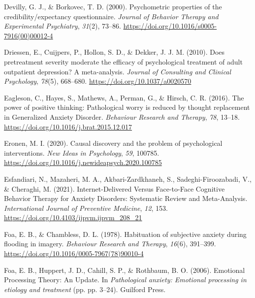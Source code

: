 \documentclass[
  man,floatsintext]{apa7}
\newlength{\cslhangindent}
\newlength{\cslentryspacingunit} %
\newenvironment{CSLReferences}[2] %
 {%
  \setlength{\parindent}{0pt}
  \ifodd #1
  \let\oldpar\par
  \def\par{\hangindent=\cslhangindent\oldpar}
  \fi
  \setlength{\parskip}{#2\cslentryspacingunit}
 }%
 {}
\begin{document}
\begin{CSLReferences}{1}{0}
\leavevmode{}%
Devilly, G. J., \& Borkovec, T. D. (2000). Psychometric properties of the credibility/expectancy questionnaire. \emph{Journal of Behavior Therapy and Experimental Psychiatry}, \emph{31}(2), 73--86. \url{https://doi.org/10.1016/s0005-7916(00)00012-4}

\leavevmode{}%
Driessen, E., Cuijpers, P., Hollon, S. D., \& Dekker, J. J. M. (2010). Does pretreatment severity moderate the efficacy of psychological treatment of adult outpatient depression? A meta-analysis. \emph{Journal of Consulting and Clinical Psychology}, \emph{78}(5), 668--680. \url{https://doi.org/10.1037/a0020570}

\leavevmode{}%
Eagleson, C., Hayes, S., Mathews, A., Perman, G., \& Hirsch, C. R. (2016). The power of positive thinking: Pathological worry is reduced by thought replacement in Generalized Anxiety Disorder. \emph{Behaviour Research and Therapy}, \emph{78}, 13--18. \url{https://doi.org/10.1016/j.brat.2015.12.017}

\leavevmode{}%
Eronen, M. I. (2020). Causal discovery and the problem of psychological interventions. \emph{New Ideas in Psychology}, \emph{59}, 100785. \url{https://doi.org/10.1016/j.newideapsych.2020.100785}

\leavevmode{}%
Esfandiari, N., Mazaheri, M. A., Akbari-Zardkhaneh, S., Sadeghi-Firoozabadi, V., \& Cheraghi, M. (2021). Internet-Delivered Versus Face-to-Face Cognitive Behavior Therapy for Anxiety Disorders: Systematic Review and Meta-Analysis. \emph{International Journal of Preventive Medicine}, \emph{12}, 153. \url{https://doi.org/10.4103/ijpvm.ijpvm_208_21}

\leavevmode{}%
Foa, E. B., \& Chambless, D. L. (1978). Habituation of subjective anxiety during flooding in imagery. \emph{Behaviour Research and Therapy}, \emph{16}(6), 391--399. \url{https://doi.org/10.1016/0005-7967(78)90010-4}

\leavevmode{}%
Foa, E. B., Huppert, J. D., Cahill, S. P., \& Rothbaum, B. O. (2006). Emotional Processing Theory: An Update. In \emph{Pathological anxiety: Emotional processing in etiology and treatment} (pp. pp. 3--24). Guilford Press.


\end{CSLReferences}
\end{document}
